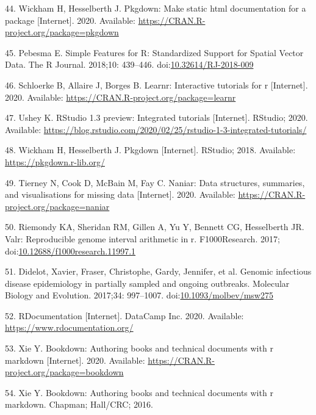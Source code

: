 \documentclass[10pt,letterpaper]{article}
\begin{document}
\leavevmode\hypertarget{ref-pkgdown}{}%
44. Wickham H, Hesselberth J. Pkgdown: Make static html documentation
for a package {[}Internet{]}. 2020. Available:
\url{https://CRAN.R-project.org/package=pkgdown}

\leavevmode\hypertarget{ref-sf}{}%
45. Pebesma E. Simple Features for R: Standardized Support for Spatial
Vector Data. The R Journal. 2018;10: 439--446.
doi:\href{https://doi.org/10.32614/RJ-2018-009}{10.32614/RJ-2018-009}

\leavevmode\hypertarget{ref-learnr}{}%
46. Schloerke B, Allaire J, Borges B. Learnr: Interactive tutorials for
r {[}Internet{]}. 2020. Available:
\url{https://CRAN.R-project.org/package=learnr}

\leavevmode\hypertarget{ref-ushey2020}{}%
47. Ushey K. RStudio 1.3 preview: Integrated tutorials {[}Internet{]}.
RStudio; 2020. Available:
\url{https://blog.rstudio.com/2020/02/25/rstudio-1-3-integrated-tutorials/}

\leavevmode\hypertarget{ref-pkgdownweb}{}%
48. Wickham H, Hesselberth J. Pkgdown {[}Internet{]}. RStudio; 2018.
Available: \url{https://pkgdown.r-lib.org/}

\leavevmode\hypertarget{ref-naniar}{}%
49. Tierney N, Cook D, McBain M, Fay C. Naniar: Data structures,
summaries, and visualisations for missing data {[}Internet{]}. 2020.
Available: \url{https://CRAN.R-project.org/package=naniar}

\leavevmode\hypertarget{ref-valr}{}%
50. Riemondy KA, Sheridan RM, Gillen A, Yu Y, Bennett CG, Hesselberth
JR. Valr: Reproducible genome interval arithmetic in r. F1000Research.
2017;
doi:\href{https://doi.org/10.12688/f1000research.11997.1}{10.12688/f1000research.11997.1}

\leavevmode\hypertarget{ref-TransPhylo}{}%
51. Didelot, Xavier, Fraser, Christophe, Gardy, Jennifer, et al. Genomic
infectious disease epidemiology in partially sampled and ongoing
outbreaks. Molecular Biology and Evolution. 2017;34: 997--1007.
doi:\href{https://doi.org/10.1093/molbev/msw275}{10.1093/molbev/msw275}

\leavevmode\hypertarget{ref-rdocumentation}{}%
52. RDocumentation {[}Internet{]}. DataCamp Inc. 2020. Available:
\url{https://www.rdocumentation.org/}

\leavevmode\hypertarget{ref-bookdown}{}%
53. Xie Y. Bookdown: Authoring books and technical documents with r
markdown {[}Internet{]}. 2020. Available:
\url{https://CRAN.R-project.org/package=bookdown}

\leavevmode\hypertarget{ref-xie2016}{}%
54. Xie Y. Bookdown: Authoring books and technical documents with r
markdown. Chapman; Hall/CRC; 2016.
\end{document}
